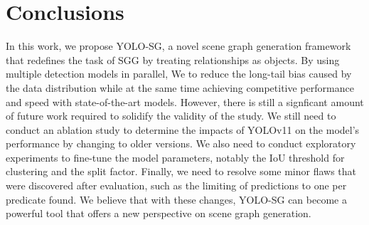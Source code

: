 \documentclass{article}
\begin{document}
\section{Conclusions}
In this work, we propose YOLO-SG, a novel scene graph generation framework that redefines the task of SGG by treating relationships as objects. By using multiple detection models in parallel, We to reduce the long-tail bias caused by the data distribution while at the same time achieving competitive performance and speed with state-of-the-art models. However, there is still a signficant amount of future work required to solidify the validity of the study. We still need to conduct an ablation study to determine the impacts of YOLOv11 on the model's performance by changing to older versions. We also need to conduct exploratory experiments to fine-tune the model parameters, notably the IoU threshold for clustering and the split factor. Finally, we need to resolve some minor flaws that were discovered after evaluation, such as the limiting of predictions to one per predicate found. We believe that with these changes, YOLO-SG can become a powerful tool that offers a new perspective on  scene graph generation.

\newpage

\end{document}
